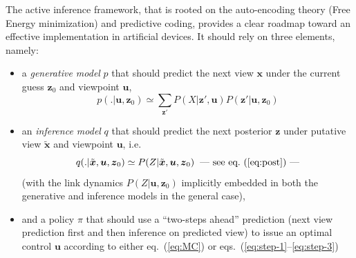 \documentclass{article}
\begin{document}
The active inference framework, that is rooted on the auto-encoding theory (Free Energy minimization) and predictive coding, provides a clear roadmap toward an effective implementation in artificial devices. It should rely on three elements, namely:
\begin{itemize}
	\item a \emph{generative model} $p$ that should predict the next view $\boldsymbol{x}$ under the current guess $\boldsymbol{z}_0$ and viewpoint $\boldsymbol{u}$, 
	$$p(.|\boldsymbol{u}, \boldsymbol{z}_0) \simeq \sum_{\boldsymbol{z}'}P(X|\boldsymbol{z}',\boldsymbol{u}) P(\boldsymbol{z}'|\boldsymbol{u},\boldsymbol{z}_0) $$
	\item an \emph{inference model} $q$ that should predict the next posterior $\boldsymbol{z}$ under putative view $\tilde{\boldsymbol{x}}$ and viewpoint $\boldsymbol{u}$, i.e.
	$$q(.|\tilde{\boldsymbol{x}}, \boldsymbol{u},\boldsymbol{z}_0) \simeq  P(Z|\tilde{\boldsymbol{x}}, \boldsymbol{u},\boldsymbol{z}_0) \text{\hspace{.2cm}---~see eq.~(\ref{eq:post})~---}$$  %
	(with the link dynamics $P(Z|\boldsymbol{u},\boldsymbol{z}_0)$ implicitly embedded in both the generative and inference models in the general case),
	\item and a policy $\pi$ that should use a ``two-steps ahead'' prediction  (next view prediction first and then inference on predicted view) to issue an optimal control $\boldsymbol{u}$ according to either eq.~(\ref{eq:MC}) or eqs.~(\ref{eq:step-1}--\ref{eq:step-3})
\end{itemize}  

\end{document}

